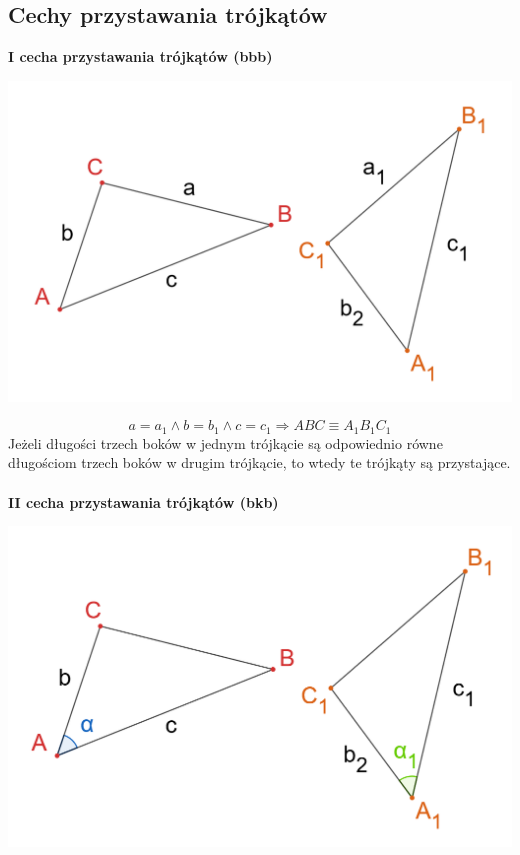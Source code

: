 \documentclass[14pt,a4paper]{extarticle}
\begin{document}
\newpage

\subsection{Cechy przystawania trójkątów}
\noindent \textbf{I cecha przystawania trójkątów (bbb)}
\begin{center}\includegraphics[scale=0.45]{geometria/przystawanie bbb.png}\end{center}
$$a=a_{1} \land b=b_{1} \land c=c_{1} \Rightarrow ABC \equiv A_{1}B_{1}C_{1}$$
\noindent Jeżeli długości trzech boków w jednym trójkącie są odpowiednio równe długościom trzech boków
w drugim trójkącie, to wtedy te trójkąty są przystające.\\\\
\noindent \textbf{II cecha przystawania trójkątów (bkb)}
\begin{center}\includegraphics[scale=0.45]{geometria/przystawanie bkb.png}\end{center}
\end{document}
